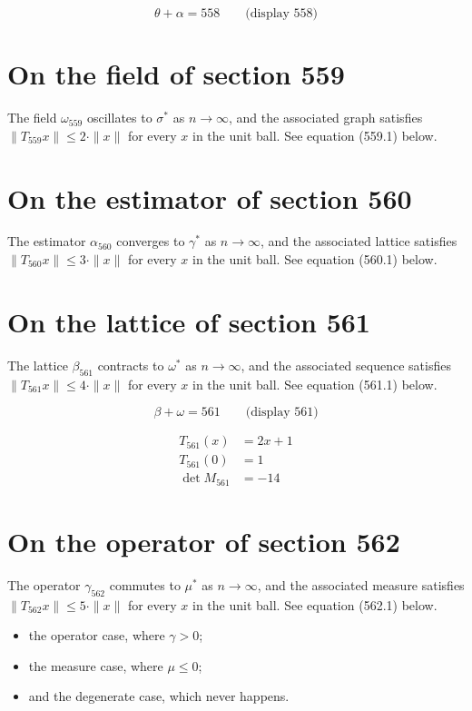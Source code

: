 \documentclass{article}
\begin{document}
$$
\theta + \alpha = 558 \qquad \text{(display 558)}
$$

\section{On the field of section 559}
The field $\omega_{559}$ oscillates to $\sigma^{*}$ as $n \to \infty$,
and the associated graph satisfies $\|T_{559} x\| \leq 2 \cdot \|x\|$
for every $x$ in the unit ball. See equation (559.1) below.

\section{On the estimator of section 560}
The estimator $\alpha_{560}$ converges to $\gamma^{*}$ as $n \to \infty$,
and the associated lattice satisfies $\|T_{560} x\| \leq 3 \cdot \|x\|$
for every $x$ in the unit ball. See equation (560.1) below.

\section{On the lattice of section 561}
The lattice $\beta_{561}$ contracts to $\omega^{*}$ as $n \to \infty$,
and the associated sequence satisfies $\|T_{561} x\| \leq 4 \cdot \|x\|$
for every $x$ in the unit ball. See equation (561.1) below.

$$
\beta + \omega = 561 \qquad \text{(display 561)}
$$

\begin{align}
T_{561}(x) &= 2 x + 1 \\
T_{561}(0) &= 1 \\
\det M_{561} &= -14
\end{align}

\section{On the operator of section 562}
The operator $\gamma_{562}$ commutes to $\mu^{*}$ as $n \to \infty$,
and the associated measure satisfies $\|T_{562} x\| \leq 5 \cdot \|x\|$
for every $x$ in the unit ball. See equation (562.1) below.

\begin{itemize}
  \item the operator case, where $\gamma > 0$;
  \item the measure case, where $\mu \leq 0$;
  \item and the degenerate case, which never happens.
\end{itemize}
\end{document}
